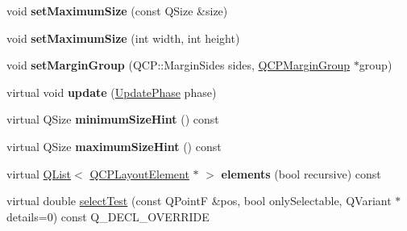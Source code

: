\begin{DoxyCompactItemize}
\item 
\mbox{\label{class_q_c_p_layout_element_a74eb5280a737ab44833d506db65efd95}} 
void {\bfseries set\+Maximum\+Size} (const Q\+Size \&size)
\item 
\mbox{\label{class_q_c_p_layout_element_a03e0e9c48f230217c529b0819f832d84}} 
void {\bfseries set\+Maximum\+Size} (int width, int height)
\item 
\mbox{\label{class_q_c_p_layout_element_a516e56f76b6bc100e8e71d329866847d}} 
void {\bfseries set\+Margin\+Group} (Q\+C\+P\+::\+Margin\+Sides sides, \hyperlink{class_q_c_p_margin_group}{Q\+C\+P\+Margin\+Group} $\ast$group)
\item 
\mbox{\label{class_q_c_p_layout_element_ad6884e89825dbe06f198f659120799e6}} 
virtual void {\bfseries update} (\hyperlink{class_q_c_p_layout_element_a0d83360e05735735aaf6d7983c56374d}{Update\+Phase} phase)
\item 
\mbox{\label{class_q_c_p_layout_element_aaf159b5e44f19c12a8e07b2903c84759}} 
virtual Q\+Size {\bfseries minimum\+Size\+Hint} () const
\item 
\mbox{\label{class_q_c_p_layout_element_a9f6f5a540798b9ec45b349cd96990a5f}} 
virtual Q\+Size {\bfseries maximum\+Size\+Hint} () const
\item 
\mbox{\label{class_q_c_p_layout_element_af1e89578547b59573b7ecb7800ff42e5}} 
virtual \hyperlink{class_q_list}{Q\+List}$<$ \hyperlink{class_q_c_p_layout_element}{Q\+C\+P\+Layout\+Element} $\ast$ $>$ {\bfseries elements} (bool recursive) const
\item 
virtual double \hyperlink{class_q_c_p_layout_element_a9e264e2033d3c136707792cd77932783}{select\+Test} (const Q\+PointF \&pos, bool only\+Selectable, Q\+Variant $\ast$details=0) const Q\+\_\+\+D\+E\+C\+L\+\_\+\+O\+V\+E\+R\+R\+I\+DE
\end{DoxyCompactItemize}
